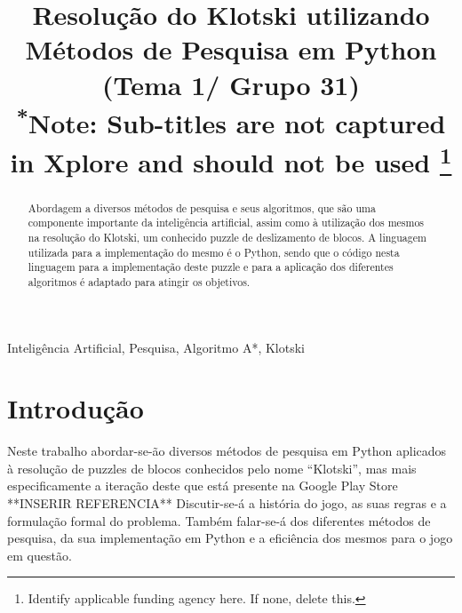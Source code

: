 \documentclass[conference]{IEEEtran}
\begin{document}
\title{Resolução do Klotski utilizando Métodos de Pesquisa em Python (Tema 1/ Grupo 31)\\
{\footnotesize \textsuperscript{*}Note: Sub-titles are not captured in Xplore and
should not be used}
\thanks{Identify applicable funding agency here. If none, delete this.}
}

\author{
\and
{}
\and
{}
}

\maketitle

\begin{abstract}
Abordagem a diversos métodos de pesquisa e seus algoritmos, que são uma componente importante da inteligência artificial, assim como à utilização dos mesmos na resolução do Klotski, um conhecido puzzle de deslizamento de blocos.
A linguagem utilizada para a implementação do mesmo é o Python, sendo que o código nesta linguagem para a implementação deste puzzle e para a aplicação dos diferentes algoritmos é adaptado para atingir os objetivos.
\end{abstract}

\begin{IEEEkeywords}
Inteligência Artificial, Pesquisa, Algoritmo A*, Klotski
\end{IEEEkeywords}

\section{Introdução}
Neste trabalho abordar-se-ão diversos métodos de pesquisa em Python aplicados à resolução de puzzles de blocos conhecidos pelo nome “Klotski”, mas mais especificamente a iteração deste que está presente na Google Play Store **INSERIR REFERENCIA** Discutir-se-á a história do jogo, as suas regras e a formulação formal do problema. Também falar-se-á dos diferentes métodos de pesquisa, da sua implementação em Python e a eficiência dos mesmos para o jogo em questão. 
\end{document}
